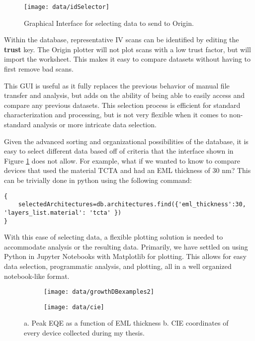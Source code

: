 \documentclass[../thesis.tex]{subfiles}
\begin{document}
\begin{figure}[ht]
\centering
\texttt{[image: data/idSelector]}
\caption{Graphical Interface for selecting data to send to Origin.}
\label{fig:idSelector}
\end{figure}

Within the database, representative IV scans can be identified by editing the \textbf{trust} key.
The Origin plotter will not plot scans with a low trust factor, but will import the worksheet.
This makes it easy to compare datasets without having to first remove bad scans.

This GUI is useful as it fully replaces the previous behavior of manual file transfer and analysis, but adds on the ability of being able to easily access and compare any previous datasets.
This selection process is efficient for standard characterization and processing, but is not very flexible when it comes to non-standard analysis or more intricate data selection.

Given the advanced sorting and organizational possibilities of the database, it is easy to select different data based off of criteria that the interface shown in Figure \ref{fig:idSelector} does not allow.
For example, what if we wanted to know to compare devices that used the material TCTA and had an EML thickness of 30 nm?
This can be trivially done in python using the following command:
\begin{lstlisting}
{
    selectedArchitectures=db.architectures.find({'eml_thickness':30, 'layers_list.material': 'tcta' })
}
\end{lstlisting}

With this ease of selecting data, a flexible plotting solution is needed to accommodate analysis or the resulting data.  
Primarily, we have settled on using Python in Jupyter Notebooks with Matplotlib for plotting.
This allows for easy data selection, programmatic analysis, and plotting, all in a well organized notebook-like format.

\begin{figure}[ht]
\centering
    \begin{subfigure}{.4\textwidth}
    \texttt{[image: data/growthDBexamples2]}
    \caption{}
    \label{fig:growthDBexamples1}\par\vfill
    \end{subfigure}
    \begin{subfigure}{.4\textwidth}
    \texttt{[image: data/cie]}
    \caption{}
    \label{fig:data_cie}\par\vfill
    \end{subfigure}
\caption{  a. Peak EQE as a function of EML thickness b. CIE coordinates of every device collected during my thesis. }
\end{figure}
\end{document}
